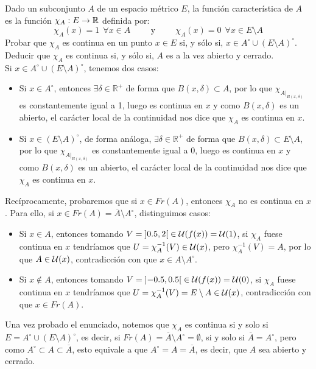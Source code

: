 \begin{ejercicio}
    Dado un subconjunto $A$ de un espacio métrico $E$, la función característica de $A$ es la función $\chi_A:E\to \mathbb{R}$ definida por:
    \begin{equation*}
        \chi_A(x)=1~~\forall x\in A
        \hspace{1cm} \text{y} \hspace{1cm}
        \chi_A(x)=0~~\forall x\in E\setminus A
    \end{equation*}
Probar que $\chi_A$ es continua en un punto $x\in E$ si, y sólo si, $x \in A^\circ \cup (E\setminus A)^\circ$. Deducir que $\chi_A$ es continua si, y sólo si, $A$ es a la vez abierto y cerrado.\\

Si $x\in A^\circ \cup {(E\setminus A)}^{\circ}$, tenemos dos casos:
\begin{itemize}
    \item Si $x\in A^\circ$, entonces $\exists \delta\in \mathbb{R}^+$ de forma que $B(x,\delta)\subset A$, por lo que $\chi_{A|_{B(x,\delta)}}$ es constantemente igual a 1, luego es continua en $x$ y como $B(x,\delta)$ es un abierto, el carácter local de la continuidad nos dice que $\chi_A$ es continua en $x$.
    \item Si $x\in {(E\setminus A)}^{\circ}$, de forma análoga, $\exists \delta\in \mathbb{R}^+$ de forma que $B(x,\delta)\subset E\setminus A$, por lo que $\chi_{A|_{B(x,\delta)}}$ es constantemente igual a 0, luego es continua en $x$ y como $B(x,\delta)$ es un abierto, el carácter local de la continuidad nos dice que $\chi_A$ es continua en $x$.
\end{itemize}
Recíprocamente, probaremos que si $x\in Fr(A)$, entonces $\chi_A$ no es continua en $x$. Para ello, si $x\in Fr(A) = \overline{A}\setminus A^\circ$, distinguimos casos:
\begin{itemize}
    \item Si $x\in A$, entonces tomando $V = \left]0.5,2\right[\in \mathcal{U}(f(x)) = \mathcal{U}(1)$, si $\chi_A$ fuese continua en $x$ tendríamos que $U = \chi_A^{-1}(V) \in \mathcal{U}(x)$, pero $\chi_A^{-1}(V) = A$, por lo que $A\in \mathcal{U}(x)$, contradicción con que $x\in A\setminus A^{\circ}$.
    \item Si $x\notin A$, entonces tomando $V = \left]-0.5,0.5\right[\in \mathcal{U}(f(x)) = \mathcal{U}(0)$, si $\chi_A$ fuese continua en $x$ tendríamos que $U = \chi_A^{-1}(V) = E\setminus A \in \mathcal{U}(x)$, contradicción con que $x\in Fr(A)$.
\end{itemize}


Una vez probado el enunciado, notemos que $\chi_A$ es continua si y solo si $E = A^\circ \cup {(E\setminus A)}^{\circ}$, es decir, si $Fr(A) = \overline{A}\setminus A^\circ = \emptyset $, si y solo si $\overline{A}=A^\circ$, pero como $A^\circ \subset A \subset \overline{A}$, esto equivale a que $A^\circ = A = \overline{A}$, es decir, que $A$ sea abierto y cerrado.
\end{ejercicio}

